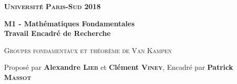 \documentclass{article}[a4paper, twoside]
\begin{document}
	\onehalfspacing %
	
	\theoremstyle{plain}
	\newtheorem{theo}{Théorème}
	\newtheorem{prop}{Proposition}
	\newtheorem{coro}{Corollaire}
	\newtheorem*{lemm}{Lemme}
	
	\theoremstyle{definition}
	\newtheorem{defi}{Définition}
	
    \begin{titlepage}
		\thispagestyle{empty}
		\vspace*{2cm}
		{\Huge\bf \textsc{Université Paris-Sud} \hfill 2018}
		\vspace*{2cm}
		\begin{center}
			{\LARGE\bf M1 - Mathématiques Fondamentales\\
			Travail Encadré de Recherche\par
			\vspace*{4cm}
			\textsc{Groupes fondamentaux et théorème de Van Kampen}}
		\end{center}
		\vspace*{8cm}
		{\Large Proposé par \textbf{Alexandre \textsc{Lieb}} et \textbf{Clément \textsc{Viney}}, 
		\hfill Encadré par \textbf{Patrick \textsc{Massot}}}
	\end{titlepage}
	
	\renewcommand{\contentsname}{Sommaire}
	\setcounter{tocdepth}{1}
	\tableofcontents
	\newpage{}
	
	
	
	
	
	
\end{document}
